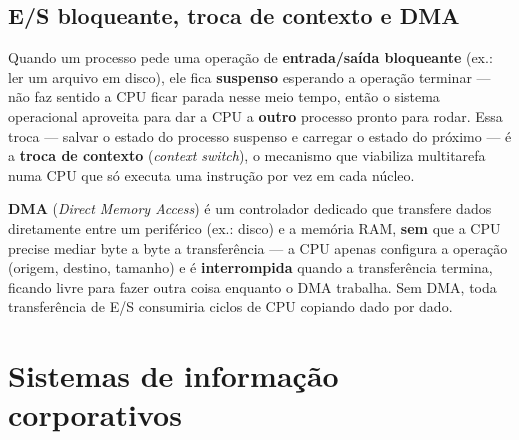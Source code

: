 \subsection{E/S bloqueante, troca de contexto e DMA}

\begin{conceito}
Quando um processo pede uma operação de \textbf{entrada/saída bloqueante}
(ex.: ler um arquivo em disco), ele fica \textbf{suspenso} esperando a
operação terminar --- não faz sentido a CPU ficar parada nesse meio tempo,
então o sistema operacional aproveita para dar a CPU a \textbf{outro}
processo pronto para rodar. Essa troca --- salvar o estado do processo
suspenso e carregar o estado do próximo --- é a \textbf{troca de contexto}
(\textit{context switch}), o mecanismo que viabiliza multitarefa numa CPU
que só executa uma instrução por vez em cada núcleo.
\end{conceito}

\begin{conceito}
\textbf{DMA} (\textit{Direct Memory Access}) é um controlador dedicado que
transfere dados diretamente entre um periférico (ex.: disco) e a memória
RAM, \textbf{sem} que a CPU precise mediar byte a byte a transferência ---
a CPU apenas configura a operação (origem, destino, tamanho) e é
\textbf{interrompida} quando a transferência termina, ficando livre para
fazer outra coisa enquanto o DMA trabalha. Sem DMA, toda transferência de
E/S consumiria ciclos de CPU copiando dado por dado.
\end{conceito}

\section{Sistemas de informação corporativos}

